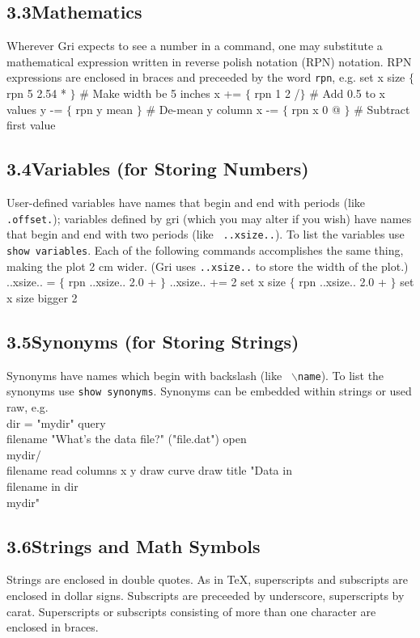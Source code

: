 \subsection{3.3\quad Mathematics}
Wherever Gri expects to see a number in a command, one may substitute
a mathematical expression written in reverse polish notation (RPN)
notation.  RPN expressions are enclosed in braces and preceeded by the
word {\tt rpn}, e.g.
\beginexample
set x size $\lbrace$ rpn 5 2.54 * $\rbrace$ \# Make width be 5 inches
x += $\lbrace$ rpn 1 2 /$\rbrace$           \# Add 0.5 to x values
y -= $\lbrace$ rpn y mean $\rbrace$         \# De-mean y column
x -= $\lbrace$ rpn x 0 @ $\rbrace$          \# Subtract first value
\endexample



\subsection{3.4\quad Variables (for Storing Numbers)}
User-defined variables have names that begin and end with periods
(like {\tt .offset.}); variables defined by gri (which you may alter
if you wish) have names that begin and end with two periods (like {\tt
..xsize..}).  To list the variables use {\tt show variables}.  Each of
the following commands accomplishes the same thing, making the plot 2
cm wider.  (Gri uses {\tt ..xsize..} to store the width of the plot.)
\beginexample
..xsize.. = $\lbrace$ rpn ..xsize.. 2.0 + $\rbrace$
..xsize.. += 2
set x size $\lbrace$ rpn ..xsize.. 2.0 + $\rbrace$
set x size bigger 2
\endexample



\subsection{3.5\quad Synonyms (for Storing Strings)}
Synonyms have names which begin with backslash (like {\tt
$\backslash$name}).  To list the synonyms use {\tt show synonyms}.
Synonyms can be embedded within strings or used raw, e.g.
\beginexample
\\dir = "mydir"
query \\filename "What's the data file?" ("file.dat")
open \\mydir/\\filename
read columns x y
draw curve
draw title "Data in \\filename in dir \\mydir"
\endexample



\subsection{3.6\quad Strings and Math Symbols}
Strings are enclosed in double quotes.  As in \TeX, superscripts and
subscripts are enclosed in dollar signs.  Subscripts are preceeded by
underscore, superscripts by carat.  Superscripts or subscripts
consisting of more than one character are enclosed in braces.

